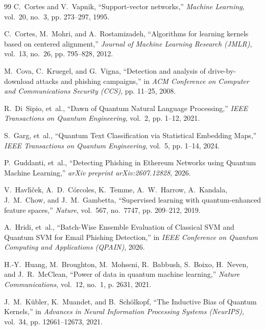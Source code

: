 \documentclass{article}
\begin{document}
\begin{thebibliography}{99}
C.~Cortes and V.~Vapnik,
\newblock ``Support-vector networks,''
\newblock \emph{Machine Learning}, vol.~20, no.~3, pp. 273--297, 1995.

C.~Cortes, M.~Mohri, and A.~Rostamizadeh,
\newblock ``Algorithms for learning kernels based on centered alignment,''
\newblock \emph{Journal of Machine Learning Research (JMLR)}, vol.~13, no.~26, pp. 795--828, 2012.

M.~Cova, C.~Kruegel, and G.~Vigna,
\newblock ``Detection and analysis of drive-by-download attacks and phishing campaigns,''
\newblock in \emph{ACM Conference on Computer and Communications Security (CCS)}, pp. 11--25, 2008.

R.~Di~Sipio, et~al.,
\newblock ``Dawn of Quantum Natural Language Processing,''
\newblock \emph{IEEE Transactions on Quantum Engineering}, vol.~2, pp. 1--12, 2021.

S.~Garg, et~al.,
\newblock ``Quantum Text Classification via Statistical Embedding Maps,''
\newblock \emph{IEEE Transactions on Quantum Engineering}, vol.~5, pp. 1--14, 2024.

P.~Guddanti, et~al.,
\newblock ``Detecting Phishing in Ethereum Networks using Quantum Machine Learning,''
\newblock \emph{arXiv preprint arXiv:2607.12828}, 2026.

V.~Havl{\'\i}{\v{c}}ek, A.~D.~C{\'o}rcoles, K.~Temme, A.~W.~Harrow, A.~Kandala, J.~M.~Chow, and J.~M.~Gambetta,
\newblock ``Supervised learning with quantum-enhanced feature spaces,''
\newblock \emph{Nature}, vol.~567, no.~7747, pp. 209--212, 2019.

A.~Hridi, et~al.,
\newblock ``Batch-Wise Ensemble Evaluation of Classical SVM and Quantum SVM for Email Phishing Detection,''
\newblock in \emph{IEEE Conference on Quantum Computing and Applications (QPAIN)}, 2026.

H.-Y.~Huang, M.~Broughton, M.~Mohseni, R.~Babbush, S.~Boixo, H.~Neven, and J.~R.~McClean,
\newblock ``Power of data in quantum machine learning,''
\newblock \emph{Nature Communications}, vol.~12, no.~1, p. 2631, 2021.

J.~M.~K{\"u}bler, K.~Muandet, and B.~Sch{\"o}lkopf,
\newblock ``The Inductive Bias of Quantum Kernels,''
\newblock in \emph{Advances in Neural Information Processing Systems (NeurIPS)}, vol.~34, pp. 12661--12673, 2021.


\end{thebibliography}
\end{document}
